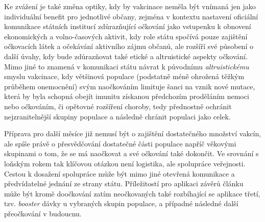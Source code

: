 Ke zvážení je také změna optiky, kdy by vakcinace neměla být vnímaná jen jako individuální benefit pro jednotlivé občany, zejména v kontextu nastavení oficiální komunikace státních institucí zdůrazňující očkování jako vstupenku k obnovení ekonomických a volno-časových aktivit, kdy role státu spočívá pouze zajištění očkovacích látek a očekávání aktivního zájmu občanů, ale rozšíří své působení o další úvahy, kdy bude zdůrazňovat také etické a altruistické aspekty očkování. %
Mimo jiné to znamená v komunikaci státu návrat k původnímu \emph{altruistickému} smyslu vakcinace, kdy většinová populace (podstatně méně ohrožená těžkým průběhem onemocnění) svým naočkováním limituje šanci na vznik nové mutace, která by byla schopná obejít imunitu získanou předchozím proděláním nemoci nebo očkováním, či opětovné rozšíření choroby, tedy přednostně ochránit nejzranitelnější skupiny populace a následně chránit populaci jako celek. 


Příprava pro další měsíce již nemusí být o zajištění dostatečného množství vakcín, ale spíše právě o přesvědčování dostatečné části populace napříč věkovými skupinami o tom, že se má naočkovat a své očkování také dokončit. Ve srovnání s loňským rokem tak klíčovou otázkou není logistika, ale spolupráce veřejnosti. Cestou k dosažení spolupráce může být mimo jiné otevřená komunikace a předvídatelné jednání ze strany státu. Příležitostí pro aplikaci závěrů článku může být kromě doočkování zatím neočkovaných také rozbíhající se aplikace třetí, tzv. \emph{booster} dávky u vybraných skupin populace, a případné následné další přeočkování v budoucnu. 







